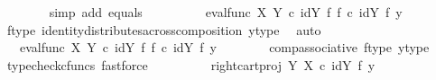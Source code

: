 \begin{isabellebody}
\ \ \ \ \ \ \isamarkupfalse%
\ {\isacharparenleft}{\kern0pt}simp\ add{\isacharcolon}{\kern0pt}\ equals{\isacharparenright}{\kern0pt}\isanewline
\ \ \ \ \isamarkupfalse%
\ \isamarkupfalse%
\ {\isachardoublequoteopen}{\isachardot}{\kern0pt}{\isachardot}{\kern0pt}{\isachardot}{\kern0pt}\ {\isacharequal}{\kern0pt}\ {\isacharparenleft}{\kern0pt}eval{\isacharunderscore}{\kern0pt}func\ X\ Y{\isacharparenright}{\kern0pt}\ {\isasymcirc}\isactrlsub c\ {\isacharparenleft}{\kern0pt}{\isacharparenleft}{\kern0pt}id{\isacharparenleft}{\kern0pt}Y{\isacharparenright}{\kern0pt}\ {\isasymtimes}\isactrlsub f\ f{\isacharparenright}{\kern0pt}\ {\isasymcirc}\isactrlsub c\ {\isacharparenleft}{\kern0pt}id{\isacharparenleft}{\kern0pt}Y{\isacharparenright}{\kern0pt}\ {\isasymtimes}\isactrlsub f\ y{\isacharparenright}{\kern0pt}{\isacharparenright}{\kern0pt}{\isachardoublequoteclose}\isanewline
\ \ \ \ \ \ \isamarkupfalse%
\ f{\isacharunderscore}{\kern0pt}type\ identity{\isacharunderscore}{\kern0pt}distributes{\isacharunderscore}{\kern0pt}across{\isacharunderscore}{\kern0pt}composition\ y{\isacharunderscore}{\kern0pt}type{}\ \isamarkupfalse%
\ auto\isanewline
\ \ \ \ \isamarkupfalse%
\ \isamarkupfalse%
\ {\isachardoublequoteopen}{\isachardot}{\kern0pt}{\isachardot}{\kern0pt}{\isachardot}{\kern0pt}\ {\isacharequal}{\kern0pt}\ {\isacharparenleft}{\kern0pt}{\isacharparenleft}{\kern0pt}eval{\isacharunderscore}{\kern0pt}func\ X\ Y{\isacharparenright}{\kern0pt}\ {\isasymcirc}\isactrlsub c\ {\isacharparenleft}{\kern0pt}id{\isacharparenleft}{\kern0pt}Y{\isacharparenright}{\kern0pt}\ {\isasymtimes}\isactrlsub f\ f{\isacharparenright}{\kern0pt}{\isacharparenright}{\kern0pt}\ {\isasymcirc}\isactrlsub c\ {\isacharparenleft}{\kern0pt}id{\isacharparenleft}{\kern0pt}Y{\isacharparenright}{\kern0pt}\ {\isasymtimes}\isactrlsub f\ y{\isacharparenright}{\kern0pt}{\isachardoublequoteclose}\isanewline
\ \ \ \ \ \ \isamarkupfalse%
\ comp{\isacharunderscore}{\kern0pt}associative{}\ f{\isacharunderscore}{\kern0pt}type\ y{\isacharunderscore}{\kern0pt}type{}\ \isamarkupfalse%
\ {\isacharparenleft}{\kern0pt}typecheck{\isacharunderscore}{\kern0pt}cfuncs{\isacharcomma}{\kern0pt}\ fastforce{\isacharparenright}{\kern0pt}\isanewline
\ \ \ \ \isamarkupfalse%
\ \isamarkupfalse%
\ {\isachardoublequoteopen}{\isachardot}{\kern0pt}{\isachardot}{\kern0pt}{\isachardot}{\kern0pt}\ {\isacharequal}{\kern0pt}\ {\isacharparenleft}{\kern0pt}right{\isacharunderscore}{\kern0pt}cart{\isacharunderscore}{\kern0pt}proj\ Y\ X{\isacharparenright}{\kern0pt}\ {\isasymcirc}\isactrlsub c\ {\isacharparenleft}{\kern0pt}id{\isacharparenleft}{\kern0pt}Y{\isacharparenright}{\kern0pt}\ {\isasymtimes}\isactrlsub f\ y{\isacharparenright}{\kern0pt}{\isachardoublequoteclose}\isanewline

\end{isabellebody}
